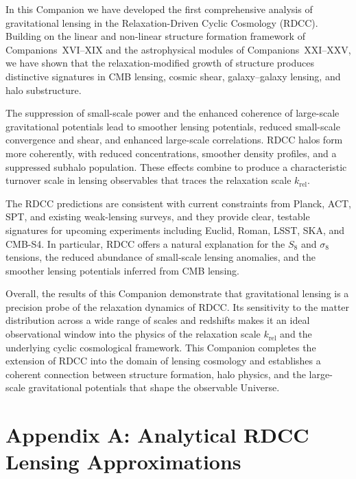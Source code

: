 \documentclass[11pt,a4paper]{article}
\begin{document}
In this Companion we have developed the first comprehensive analysis of gravitational lensing
in the Relaxation-Driven Cyclic Cosmology (RDCC). Building on the linear and non-linear
structure formation framework of Companions~XVI–XIX and the astrophysical modules of
Companions~XXI–XXV, we have shown that the relaxation-modified growth of structure
produces distinctive signatures in CMB lensing, cosmic shear, galaxy–galaxy lensing, and halo
substructure.

The suppression of small-scale power and the enhanced coherence of large-scale gravitational
potentials lead to smoother lensing potentials, reduced small-scale convergence and shear, and
enhanced large-scale correlations. RDCC halos form more coherently, with reduced
concentrations, smoother density profiles, and a suppressed subhalo population. These effects
combine to produce a characteristic turnover scale in lensing observables that traces the
relaxation scale $k_{\mathrm{rel}}$.

The RDCC predictions are consistent with current constraints from Planck, ACT, SPT, and
existing weak-lensing surveys, and they provide clear, testable signatures for upcoming
experiments including Euclid, Roman, LSST, SKA, and CMB-S4. In particular, RDCC offers a
natural explanation for the $S_{8}$ and $\sigma_{8}$ tensions, the reduced abundance of small-scale
lensing anomalies, and the smoother lensing potentials inferred from CMB lensing.

Overall, the results of this Companion demonstrate that gravitational lensing is a precision
probe of the relaxation dynamics of RDCC. Its sensitivity to the matter distribution across a
wide range of scales and redshifts makes it an ideal observational window into the physics of
the relaxation scale $k_{\mathrm{rel}}$ and the underlying cyclic cosmological framework. This
Companion completes the extension of RDCC into the domain of lensing cosmology and
establishes a coherent connection between structure formation, halo physics, and the large-scale
gravitational potentials that shape the observable Universe.

\appendix
\section*{Appendix A: Analytical RDCC Lensing Approximations}
\end{document}
